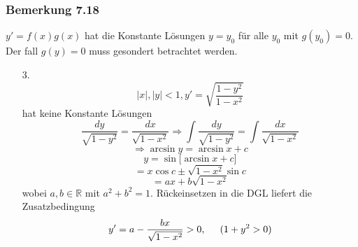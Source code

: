 \subsubsection*{Bemerkung 7.18}
$y'=f(x)g(x)$ hat die Konstante Lösungen $y=y_0$ für alle $y_0$ mit $g(y_0)=0$. Der fall $g(y)=0$ muss gesondert betrachtet werden. 
\begin{enumerate}
\item[3.] \[\left| x\right|, \left| y\right|<1,y'=\sqrt{\frac{1-y^2}{1-x^2}}\]
hat keine Konstante Lösungen 
\[\frac{{dy}}{{\sqrt {1 - {y^2}} }} = \frac{{dx}}{{\sqrt {1 - {x^2}} }} \Rightarrow \int {\frac{{dy}}{{\sqrt {1 - {y^2}} }}}  = \int {\frac{{dx}}{{\sqrt {1 - {x^2}} }}} \]
\[\Rightarrow \arcsin y=\arcsin x+c\]
\[y=\sin\lbrack\arcsin x+c \rbrack\]
\[=x\cos c\pm\sqrt{1-x^2}\sin c\]
\[=ax+b\sqrt{1-x^2}\]
wobei $a,b\in\mathbb{R}$ mit $a^2+b^2=1$. Rückeinsetzen in die DGL liefert die Zusatzbedingung \[y'=a-\frac{bx}{\sqrt{1-x^2}}>0,\hspace{5mm} (1+y^2>0)\]
\end{enumerate}
